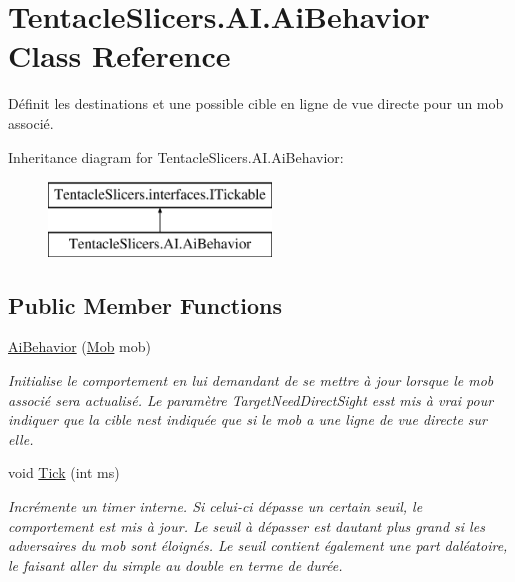 \hypertarget{class_tentacle_slicers_1_1_a_i_1_1_ai_behavior}{}\section{Tentacle\+Slicers.\+A\+I.\+Ai\+Behavior Class Reference}
\label{class_tentacle_slicers_1_1_a_i_1_1_ai_behavior}


Définit les destinations et une possible cible en ligne de vue directe pour un mob associé.  


Inheritance diagram for Tentacle\+Slicers.\+A\+I.\+Ai\+Behavior\+:\begin{figure}[H]
\begin{center}
\leavevmode
\includegraphics[height=2.000000cm]{class_tentacle_slicers_1_1_a_i_1_1_ai_behavior}
\end{center}
\end{figure}
\subsection*{Public Member Functions}
\begin{DoxyCompactItemize}
\item 
\hyperlink{class_tentacle_slicers_1_1_a_i_1_1_ai_behavior_a1aa1d81aed97a3259a55768fd442f421}{Ai\+Behavior} (\hyperlink{class_tentacle_slicers_1_1actors_1_1_mob}{Mob} mob)
\begin{DoxyCompactList}\small\item\em Initialise le comportement en lui demandant de se mettre à jour lorsque le mob associé sera actualisé. Le paramètre Target\+Need\+Direct\+Sight esst mis à vrai pour indiquer que la cible n\textquotesingle{}est indiquée que si le mob a une ligne de vue directe sur elle. \end{DoxyCompactList}\item 
void \hyperlink{class_tentacle_slicers_1_1_a_i_1_1_ai_behavior_acec78a17fc2bc5784aa12ef11e11a685}{Tick} (int ms)
\begin{DoxyCompactList}\small\item\em Incrémente un timer interne. Si celui-\/ci dépasse un certain seuil, le comportement est mis à jour. Le seuil à dépasser est d\textquotesingle{}autant plus grand si les adversaires du mob sont éloignés. Le seuil contient également une part d\textquotesingle{}aléatoire, le faisant aller du simple au double en terme de durée. \end{DoxyCompactList}\end{DoxyCompactItemize}
